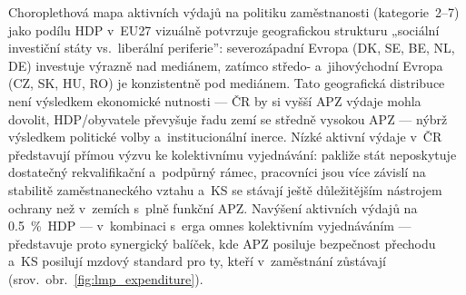 Choroplethová mapa aktivních výdajů na politiku zaměstnanosti (kategorie~2--7) jako podílu \ac{HDP} v~\ac{EU}27 vizuálně potvrzuje geografickou strukturu „sociální investiční státy vs.~liberální periferie”: severozápadní Evropa (DK, SE, BE, NL, DE) investuje výrazně nad mediánem, zatímco středo- a~jihovýchodní Evropa (CZ, SK, HU, RO) je konzistentně pod mediánem.
Tato geografická distribuce není výsledkem ekonomické nutnosti --- ČR by si vyšší \ac{APZ} výdaje mohla dovolit, \ac{HDP}/obyvatele převyšuje řadu zemí se středně vysokou \ac{APZ} --- nýbrž výsledkem politické volby a~institucionální inerce.
Nízké aktivní výdaje v~ČR představují přímou výzvu ke kolektivnímu vyjednávání: pakliže stát neposkytuje dostatečný rekvalifikační a~podpůrný rámec, pracovníci jsou více závislí na stabilitě zaměstnaneckého vztahu a~\ac{KS} se stávají ještě důležitějším nástrojem ochrany než v~zemích s~plně funkční \ac{APZ}.
Navýšení aktivních výdajů na \SI{0,5}{\percent}~\ac{HDP} --- v~kombinaci s~erga omnes kolektivním vyjednáváním --- představuje proto synergický balíček, kde \ac{APZ} posiluje bezpečnost přechodu a~\ac{KS} posilují mzdový standard pro ty, kteří v~zaměstnání zůstávají (srov.~obr.~\ref{fig:lmp_expenditure}).


